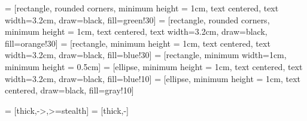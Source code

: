 %
%
%


 =  [rectangle, rounded corners, minimum height = 1cm, text centered, text width=3.2cm, draw=black, fill=green!30]
 =  [rectangle, rounded corners, minimum height = 1cm, text centered, text width=3.2cm, draw=black, fill=orange!30]
 =  [rectangle, minimum height = 1cm, text centered, text width=3.2cm, draw=black, fill=blue!30]
 =  [rectangle,  minimum width=1cm, minimum height = 0.5cm]
 =  [ellipse, minimum height = 1cm, text centered, text width=3.2cm, draw=black, fill=blue!10]
 =  [ellipse, minimum height = 1cm, text centered, draw=black, fill=gray!10]

 = [thick,->,>=stealth]
 = [thick,-]







